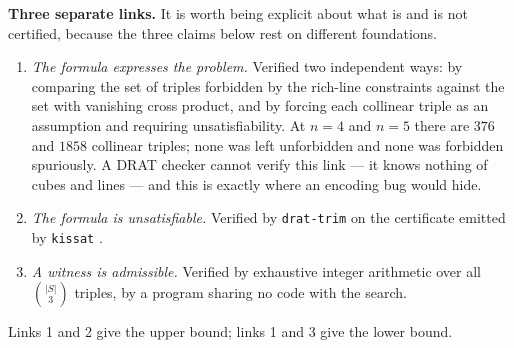 \documentclass[11pt,a4paper]{article}
\begin{document}
\medskip\noindent\textbf{Three separate links.}  It is worth being explicit about what is and is not certified,
because the three claims below rest on different foundations.
\begin{enumerate}\itemsep2pt
\item \emph{The formula expresses the problem.}  Verified two independent ways: by comparing the set of
triples forbidden by the rich-line constraints against the set with vanishing cross product, and by forcing each
collinear triple as an assumption and requiring unsatisfiability.  At $n=4$ and $n=5$ there are $376$ and $1858$
collinear triples; none was left unforbidden and none was forbidden spuriously.  A DRAT checker cannot verify
this link --- it knows nothing of cubes and lines --- and this is exactly where an encoding bug would hide.
\item \emph{The formula is unsatisfiable.}  Verified by \texttt{drat-trim} \cite{DratTrim} on the certificate emitted by
\texttt{kissat} \cite{Kissat}.
\item \emph{A witness is admissible.}  Verified by exhaustive integer arithmetic over all $\binom{|S|}{3}$
triples, by a program sharing no code with the search.
\end{enumerate}
Links 1 and 2 give the upper bound; links 1 and 3 give the lower bound.
\end{document}
